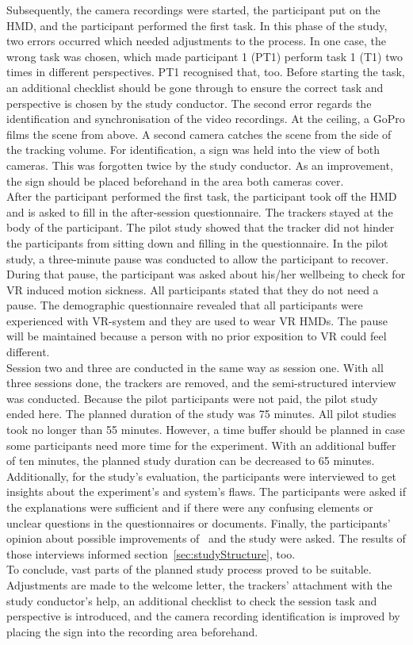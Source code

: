 Subsequently, the camera recordings were started, the participant put on the HMD, and the participant performed the first task. In this phase of the study, two errors occurred which needed adjustments to the process. In one case, the wrong task was chosen, which made participant 1 (PT1) perform task 1 (T1) two times in different perspectives. PT1 recognised that, too. Before starting the task, an additional checklist should be gone through to ensure the correct task and perspective is chosen by the study conductor. The second error regards the identification and synchronisation of the video recordings. At the ceiling, a GoPro films the scene from above. A second camera catches the scene from the side of the tracking volume. For identification, a sign was held into the view of both cameras. This was forgotten twice by the study conductor. As an improvement, the sign should be placed beforehand in the area both cameras cover.\\
After the participant performed the first task, the participant took off the HMD and is asked to fill in the after-session questionnaire. The trackers stayed at the body of the participant. The pilot study showed that the tracker did not hinder the participants from sitting down and filling in the questionnaire. In the pilot study, a three-minute pause was conducted to allow the participant to recover. During that pause, the participant was asked about his/her wellbeing to check for VR induced motion sickness. All participants stated that they do not need a pause. The demographic questionnaire revealed that all participants were experienced with VR-system and they are used to wear VR HMDs. The pause will be maintained because a person with no prior exposition to VR could feel different.\\
Session two and three are conducted in the same way as session one. With all three sessions done, the trackers are removed, and the semi-structured interview was conducted. Because the pilot participants were not paid, the pilot study ended here. The planned duration of the study was 75 minutes. All pilot studies took no longer than 55 minutes. However, a time buffer should be planned in case some participants need more time for the experiment. With an additional buffer of ten minutes, the planned study duration can be decreased to 65 minutes.\\
Additionally, for the study's evaluation, the participants were interviewed to get insights about the experiment's and system's flaws. The participants were asked if the explanations were sufficient and if there were any confusing elements or unclear questions in the questionnaires or documents. Finally, the participants' opinion about possible improvements of \exgo\ and the study were asked. The results of those interviews informed section~\ref{sec:studyStructure}, too.\\
To conclude, vast parts of the planned study process proved to be suitable. Adjustments are made to the welcome letter, the trackers' attachment with the study conductor's help, an additional checklist to check the session task and perspective is introduced, and the camera recording identification is improved by placing the sign into the recording area beforehand.

